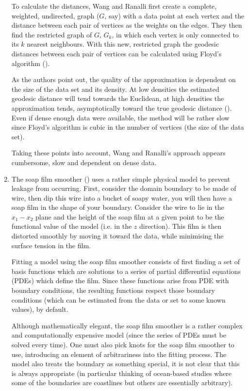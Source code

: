 \begin{enumerate}
To calculate the distances, Wang and Ranalli first create a complete, weighted, undirected, graph ($G$, say) with a data point at each vertex and the distance between each pair of vertices as the weights on the edges. They then find the restricted graph of $G$, $G_k$, in which each vertex is only connected to its $k$ nearest neighbours. With this new, restricted graph the geodesic distances between each pair of vertices can be calculated using Floyd's algorithm (\cite{Floyd}).

As the authors point out, the quality of the approximation is dependent on the size of the data set and its density. At low densities the estimated geodesic distance will tend towards the Euclidean, at high densities the approximation tends, asymptotically toward the true geodesic distance (\cite{bernstein}). Even if  dense enough data were available, the method will be rather slow since Floyd's algorithm is cubic in the number of vertices (the size of the data set). 

Taking these points into account, Wang and Ranalli's approach appears cumbersome, slow and dependent on dense data.

\item The soap film smoother (\cite{soap}) uses a rather simple physical model to prevent leakage from occurring. First, consider the domain boundary to be made of wire, then dip this wire into a bucket of soapy water, you will then have a soap film in the shape of your boundary. Consider the wire to lie in the $x_1-x_2$ plane and the height of the soap film at a given point to be the functional value of the model (i.e. in the $z$ direction). This film is then distorted smoothly by moving it toward the data, while minimising the surface tension in the film.

Fitting a model using the soap film smoother consists of first finding a set of basis functions which are solutions to a series of partial differential equations (PDEs) which define the film. Since these functions arise from PDE with boundary conditions, the resulting functions respect those boundary conditions (which can be estimated from the data or set to some known values), by default. 

Although mathematically elegant, the soap film smoother is a rather complex and computationally expensive model (since the series of PDEs must be solved every time). One must also pick knots for the soap film smoother to use, introducing an element of arbitrariness into the fitting process. The model also treats the boundary as something special, it is not clear that this is always appropriate (in particular thinking of ocean-based studies where some of the boundaries are coastlines but others are essentially arbitrary).


\end{enumerate}
